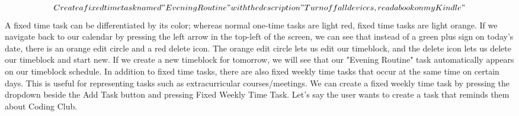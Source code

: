 \documentclass[notitlepage]{report}
\begin{document}
\[Create a fixed time task named "Evening Routine" with the description "Turn off all devices, read a book on my Kindle"\]
A fixed time task can be differentiated by its color; whereas normal one-time tasks are light red, fixed time tasks are light orange.
If we navigate back to our calendar by pressing the left arrow in the top-left of the screen, we can see that instead of a green plus sign on today's date, there is an orange edit circle and a red delete icon. The orange edit circle lets us edit our timeblock, and the delete icon lets us delete our timeblock and start new.
If we create a new timeblock for tomorrow, we will see that our "Evening Routine" task automatically appears on our timeblock schedule.
In addition to fixed time tasks, there are also fixed weekly time tasks that occur at the same time on certain days. This is useful for representing tasks such as extracurricular courses/meetings. We can create a fixed weekly time task by pressing the dropdown beside the Add Task button and pressing Fixed Weekly Time Task. Let's say the user wants to create a task that reminds them about Coding Club.
\[\]
\end{document}
